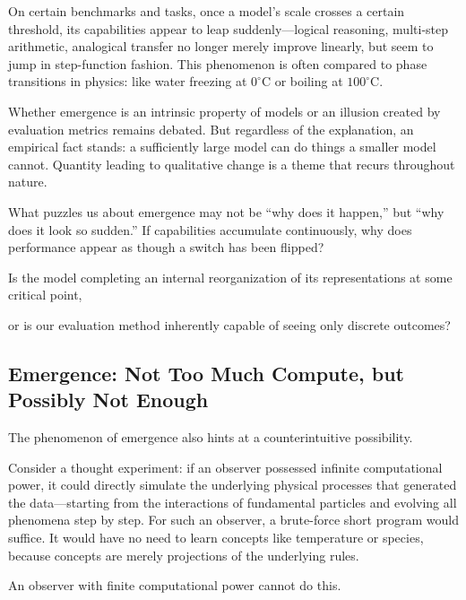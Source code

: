 On certain benchmarks and tasks, once a model's scale crosses a certain threshold, its capabilities appear to leap suddenly---logical reasoning, multi-step arithmetic, analogical transfer no longer merely improve linearly, but seem to jump in step-function fashion. This phenomenon is often compared to phase transitions in physics: like water freezing at $0^\circ\mathrm{C}$ or boiling at $100^\circ\mathrm{C}$.

\vspace{1em}

Whether emergence is an intrinsic property of models or an illusion created by evaluation metrics remains debated. But regardless of the explanation, an empirical fact stands: a sufficiently large model can do things a smaller model cannot. Quantity leading to qualitative change is a theme that recurs throughout nature.

\vspace{1em}

What puzzles us about emergence may not be ``why does it happen,'' but ``why does it look so sudden.''
If capabilities accumulate continuously, why does performance appear as though a switch has been flipped?

Is the model completing an internal reorganization of its representations at some critical point,

or is our evaluation method inherently capable of seeing only discrete outcomes?

\newpage
\subsection{Emergence: Not Too Much Compute, but Possibly Not Enough}

The phenomenon of emergence also hints at a counterintuitive possibility.

Consider a thought experiment: if an observer possessed infinite computational power, it could directly simulate the underlying physical processes that generated the data---starting from the interactions of fundamental particles and evolving all phenomena step by step. For such an observer, a brute-force short program would suffice. It would have no need to learn concepts like temperature or species, because concepts are merely projections of the underlying rules.

\vspace{1em}

An observer with finite computational power cannot do this.

